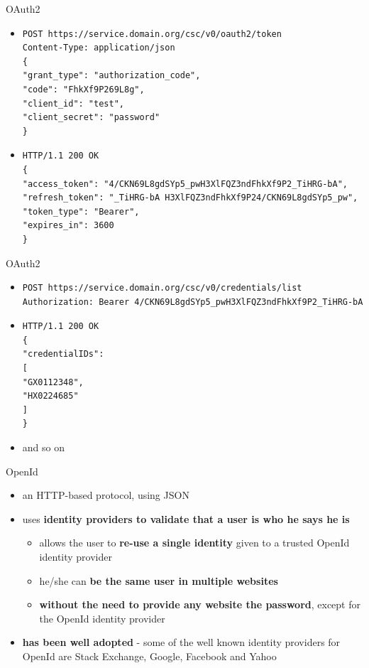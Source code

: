 \documentclass[pdf]{beamer}
\begin{document}
\begin{frame}[fragile]{OAuth2}
\begin{itemize}
\item
\begin{verbatim}
POST https://service.domain.org/csc/v0/oauth2/token
Content-Type: application/json
{
"grant_type": "authorization_code",
"code": "FhkXf9P269L8g",
"client_id": "test",
"client_secret": "password"
}
\end{verbatim}

\item
\begin{verbatim}
HTTP/1.1 200 OK
{
"access_token": "4/CKN69L8gdSYp5_pwH3XlFQZ3ndFhkXf9P2_TiHRG-bA",
"refresh_token": "_TiHRG-bA H3XlFQZ3ndFhkXf9P24/CKN69L8gdSYp5_pw",
"token_type": "Bearer",
"expires_in": 3600
}
\end{verbatim}
\end{itemize}
\end{frame}



\begin{frame}[fragile]{OAuth2}
\begin{itemize}
\item
\begin{verbatim}
POST https://service.domain.org/csc/v0/credentials/list
Authorization: Bearer 4/CKN69L8gdSYp5_pwH3XlFQZ3ndFhkXf9P2_TiHRG-bA
\end{verbatim}

\item
\begin{verbatim}
HTTP/1.1 200 OK
{
"credentialIDs":
[
"GX0112348",
"HX0224685"
]
}
\end{verbatim}

\item
and so on
\end{itemize}
\end{frame}



\begin{frame}{OpenId}
\begin{itemize}
\item
an HTTP-based protocol, using JSON

\item
uses \textbf{identity providers to validate that a user is who he says he is}

\begin{itemize}
\item
allows the user to \textbf{re-use a single identity} given to a trusted OpenId identity provider
\item
he/she can \textbf{be the same user in multiple websites}
\item
\textbf{without the need to provide any website the password}, except for the OpenId identity provider
\end{itemize}

\item
\textbf{has been well adopted} - some of the well known identity providers for OpenId are Stack Exchange, Google, Facebook and Yahoo
\end{itemize}
\end{frame}
\end{document}
